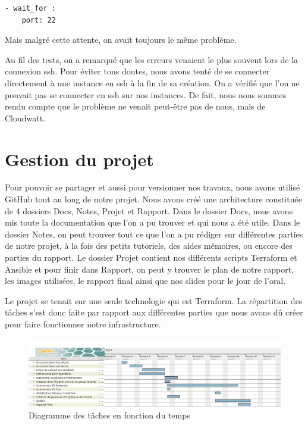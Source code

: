 \documentclass[]{article}
\begin{document}
\begin{verbatim}
- wait_for :
    port: 22
\end{verbatim}

Mais malgré cette attente, on avait toujours le même problème.

Au fil des tests, on a remarqué que les erreurs venaient le plus souvent
lors de la connexion ssh. Pour éviter tous doutes, nous avons tenté de se
connecter directement à une instance en ssh à  la fin de sa création.
On a vérifié que l'on ne pouvait pas se connecter en
ssh sur nos instances. De fait, nous nous sommes rendu compte que le problème ne
venait peut-être pas de nous, mais de Cloudwatt. 

\newpage
\section{Gestion du projet}\label{ruxe9partition-des-tuxe2ches-au-seins-du-groupe}

Pour pouvoir se partager et aussi pour versionner nos travaux, nous avons utilisé GitHub tout au long de notre projet. 
Nous avons créé une architecture constituée de 4 dossiers Docs, Notes, Projet et Rapport.
Dans le dossier Docs, nous avons mis toute la documentation que l'on a pu trouver et qui nous a été utile. Dans le dossier Notes, on peut trouver tout ce que l'on a pu rédiger sur différentes parties de notre projet, à la fois des petits tutoriels, des aides mémoires, ou encore des parties du rapport. Le dossier Projet contient nos différents scripts Terraform et Ansible et pour finir dans Rapport, on peut y trouver le plan de notre rapport, les images utilisées, le rapport final ainsi que nos slides pour le jour de l'oral.

Le projet se tenait sur une seule technologie qui est Terraform. La
répartition des tâches s'est donc faite par rapport aux différentes
parties que nous avons dû créer pour faire fonctionner notre
infrastructure.

\begin{figure}
\centering
\includegraphics{Images/TerraFormGant.png}
\caption{Diagramme des tâches en fonction du temps}
\end{figure}
\end{document}

